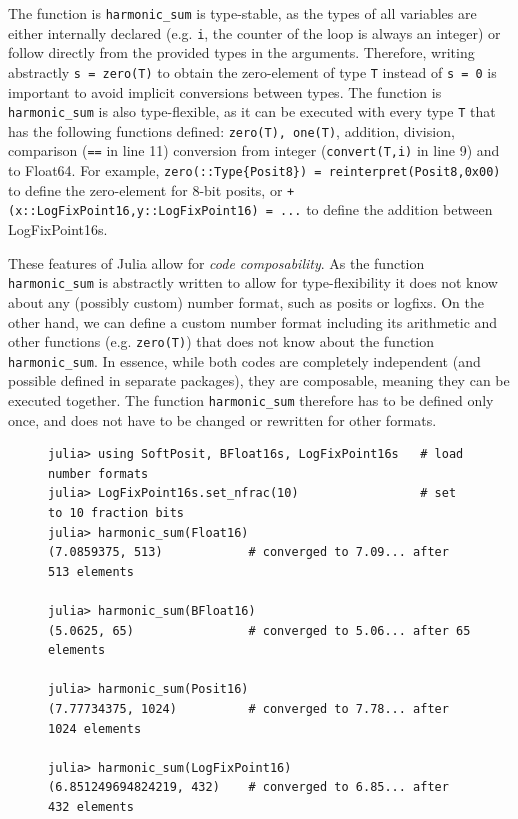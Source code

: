 The function is \texttt{harmonic\_sum} is type-stable, as the types of all variables are either internally declared (e.g.
\texttt{i}, the counter of the loop is always an integer) or follow directly from the provided types in the arguments.
Therefore, writing abstractly \texttt{s = zero(T)} to obtain the zero-element of type \texttt{T} instead of \texttt{s = 0}
is important to avoid implicit conversions between types. The function is \texttt{harmonic\_sum} is also type-flexible,
as it can be executed with every type \texttt{T} that has the following functions defined: \texttt{zero(T), one(T)}, addition,
division, comparison (\texttt{==} in line 11) conversion from integer (\texttt{convert(T,i)} in line 9) and to Float64.
For example, \texttt{zero(::Type\{Posit8\}) = reinterpret(Posit8,0x00)} to define the zero-element for 8-bit posits, or
\texttt{+(x::LogFixPoint16,y::LogFixPoint16) = ...} to define the addition between LogFixPoint16s.

These features of Julia allow for \emph{code composability}. As the function \texttt{harmonic\_sum} is abstractly written
to allow for type-flexibility it does not know about any (possibly custom) number format, such as posits or logfixs.
On the other hand, we can define a custom number format including its arithmetic and other functions
(e.g. \texttt{zero(T)}) that does not know about the function \texttt{harmonic\_sum}. In essence, while both codes
are completely independent (and possible defined in separate packages), they are composable, meaning they can
be executed together. The function \texttt{harmonic\_sum} therefore has to be defined only once, and does not have
to be  changed or rewritten for other formats.

\begin{figure}[tbhp]
\begin{lstlisting}[language=JuliaLocal, label=lst:harmonic_sum2, caption={\textbf{Executing \texttt{harmonic\_sum} with different
number formats in the Julia shell.}ABC}]
julia> using SoftPosit, BFloat16s, LogFixPoint16s   # load number formats
julia> LogFixPoint16s.set_nfrac(10)                 # set to 10 fraction bits
julia> harmonic_sum(Float16)
(7.0859375, 513)            # converged to 7.09... after 513 elements

julia> harmonic_sum(BFloat16)
(5.0625, 65)                # converged to 5.06... after 65 elements

julia> harmonic_sum(Posit16)
(7.77734375, 1024)          # converged to 7.78... after 1024 elements

julia> harmonic_sum(LogFixPoint16)
(6.851249694824219, 432)    # converged to 6.85... after 432 elements
\end{lstlisting}
\end{figure}

